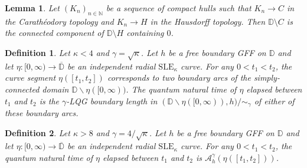 \documentclass[10pt,a4paper]{amsart}
\newtheorem{lemma}{Lemma}
\newtheorem{definition}{Definition}
\newcommand{\D}{\mathbb{D}}
\newcommand{\N}{\mathbb{N}}
\newcommand{\SLE}{\mathrm{SLE}}
\newcommand{\cA}{\mathcal{A}}
\newcommand{\clD}{\overline{\mathbb{D}}}
\begin{document}
\begin{lemma}\label{lem-hausdorff-cara-conv}
Let $(K_n)_{n \in \N}$ be a sequence of compact hulls such that $K_n \to C$ in the Carath\'eodory topology and $K_n \to H$ in the Hausdorff topology. Then $\D \setminus C$ is the connected component of $\D \setminus H$ containing $0$.
\end{lemma}

\begin{definition}\label{def-quantum-time-simple}
    Let $\kappa < 4$ and $\gamma = \sqrt \kappa$. Let $h$ be a free boundary GFF on $\D$ and let $\eta: [0,\infty) \to \clD$ be an independent radial $\SLE_\kappa$ curve. For any $0 < t_1 < t_2$,
    the curve segment $\eta([t_1, t_2])$ corresponds to two boundary arcs of the simply-connected domain $\D \backslash \eta([0,\infty))$. 
    The \emph{quantum natural time} of $\eta$ elapsed between $t_1$ and $t_2$ is the $\gamma$-LQG boundary length in $(\D \backslash \eta([0,\infty)), h)/{\sim_\gamma}$ of either of these boundary arcs.
\end{definition}

\begin{definition}\label{def-quantum-time-sf}
    Let $\kappa >8$ and $\gamma = 4/\sqrt \kappa$. Let $h$ be a free boundary GFF on $\D$ and let $\eta: [0,\infty) \to \clD$ be an independent radial $\SLE_\kappa$ curve. For any $0 < t_1 < t_2$,
     the \emph{quantum natural time} of $\eta$ elapsed between $t_1$ and $t_2$ is $\cA^\gamma_h(\eta([t_1, t_2]))$.
\end{definition}
\end{document}

